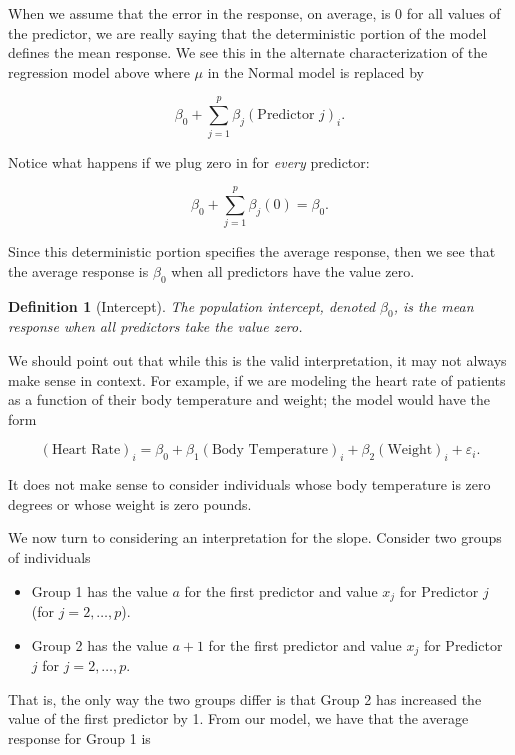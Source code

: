 \documentclass[
]{book}
\providecommand{\tightlist}{%
  \setlength{\itemsep}{0pt}\setlength{\parskip}{0pt}}
\theoremstyle{plain}
\theoremstyle{mydefn}
\newtheorem{definition}{Definition}[chapter]
\theoremstyle{myexmpl}
\theoremstyle{remark}
\begin{document}
When we assume that the error in the response, on average, is 0 for all values of the predictor, we are really saying that the deterministic portion of the model defines the mean response. We see this in the alternate characterization of the regression model above where \(\mu\) in the Normal model is replaced by

\[\beta_0 + \sum_{j=1}^{p} \beta_j (\text{Predictor } j)_i.\]

Notice what happens if we plug zero in for \emph{every} predictor:

\[\beta_0 + \sum_{j=1}^{p} \beta_j (0) = \beta_0.\]

Since this deterministic portion specifies the average response, then we see that the average response is \(\beta_0\) when all predictors have the value zero.

\begin{definition}[Intercept]
The population intercept, denoted \(\beta_0\), is the \emph{mean} response when all predictors take the value zero.
\end{definition}

We should point out that while this is the valid interpretation, it may not always make sense in context. For example, if we are modeling the heart rate of patients as a function of their body temperature and weight; the model would have the form

\[(\text{Heart Rate})_i = \beta_0 + \beta_1 (\text{Body Temperature})_i + \beta_2 (\text{Weight})_i + \varepsilon_i.\]

It does not make sense to consider individuals whose body temperature is zero degrees or whose weight is zero pounds.

We now turn to considering an interpretation for the slope. Consider two groups of individuals

\begin{itemize}
\tightlist
\item
  Group 1 has the value \(a\) for the first predictor and value \(x_j\) for Predictor \(j\) (for \(j = 2, \dotsc, p\)).
\item
  Group 2 has the value \(a + 1\) for the first predictor and value \(x_j\) for Predictor \(j\) for \(j = 2, \dotsc, p\).
\end{itemize}

That is, the only way the two groups differ is that Group 2 has increased the value of the first predictor by 1. From our model, we have that the average response for Group 1 is
\end{document}
